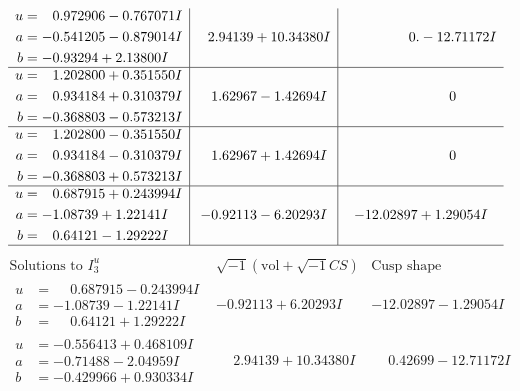 \documentclass[1p]{elsarticle_modified}
\theoremstyle{definition}
\newcommand{\I}{\sqrt{-1}}
\begin{document}
$$\begin{array}{c|c|c}
\begin{aligned}
u &= \phantom{-}0.972906 - 0.767071 I \\
a &= -0.541205 - 0.879014 I \\
b &= -0.93294 + 2.13800 I\end{aligned}
 & \phantom{-}2.94139 + 10.34380 I & \phantom{-0.000000 } 0. - 12.71172 I \\ \hline\begin{aligned}
u &= \phantom{-}1.202800 + 0.351550 I \\
a &= \phantom{-}0.934184 + 0.310379 I \\
b &= -0.368803 - 0.573213 I\end{aligned}
 & \phantom{-}1.62967 - 1.42694 I & \phantom{-0.000000 } 0 \\ \hline\begin{aligned}
u &= \phantom{-}1.202800 - 0.351550 I \\
a &= \phantom{-}0.934184 - 0.310379 I \\
b &= -0.368803 + 0.573213 I\end{aligned}
 & \phantom{-}1.62967 + 1.42694 I & \phantom{-0.000000 } 0 \\ \hline\begin{aligned}
u &= \phantom{-}0.687915 + 0.243994 I \\
a &= -1.08739 + 1.22141 I \\
b &= \phantom{-}0.64121 - 1.29222 I\end{aligned}
 & -0.92113 - 6.20293 I & -12.02897 + 1.29054 I\\
 \hline 
 \end{array}$$\newpage$$\begin{array}{c|c|c}  
\text{Solutions to }I^u_{3}& \I (\text{vol} + \sqrt{-1}CS) & \text{Cusp shape}\\
 \hline 
\begin{aligned}
u &= \phantom{-}0.687915 - 0.243994 I \\
a &= -1.08739 - 1.22141 I \\
b &= \phantom{-}0.64121 + 1.29222 I\end{aligned}
 & -0.92113 + 6.20293 I & -12.02897 - 1.29054 I \\ \hline\begin{aligned}
u &= -0.556413 + 0.468109 I \\
a &= -0.71488 - 2.04959 I \\
b &= -0.429966 + 0.930334 I\end{aligned}
 & \phantom{-}2.94139 + 10.34380 I & \phantom{-}0.42699 - 12.71172 I \\ \hline\begin{aligned}

\end{aligned}
\end{array}$$
\end{document}
